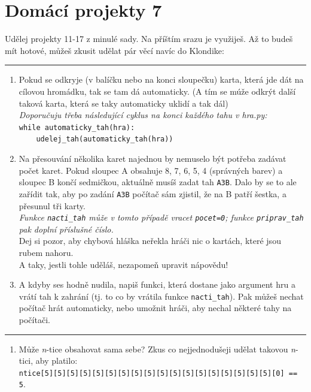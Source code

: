 \documentclass[a4paper,10pt]{article}
\newcommand\plsetno{7}
\begin{document}
\section*{Domácí projekty \plsetno}

Udělej projekty 11-17 z minulé sady. Na příštím srazu je využiješ.
Až to budeš mít hotové, můžeš zkusit udělat pár věcí navíc do Klondike:

\bigskip\bigskip
\hrule

\begin{enumerate}

\item Pokud se odkryje (v balíčku nebo na konci sloupečku) karta, která jde dát
    na cílovou hromádku, tak se tam dá automaticky.
    (A tím se múže odkrýt další taková karta, která se taky automaticky
    uklidí a tak dál)
    \\\emph{Doporučuju třeba následující cyklus na konci každého tahu v hra.py:}
    \\\verb+while automaticky_tah(hra):+
    \\\verb+    udelej_tah(automaticky_tah(hra))+

\item Na přesouvání několika karet najednou by nemuselo být potřeba zadávat
    počet karet. Pokud sloupec A obsahuje 8, 7, 6, 5, 4 (správných barev)
    a sloupec B končí sedmičkou, aktuálně musíš zadat tah \verb+A3B+.
    Dalo by se to ale zařídit tak, aby po zadání \verb+A3B+ počítač
    sám zjistil, že na B patří šestka, a přesunul tři karty.
    \\\emph{Funkce \texttt{nacti\_tah} může v tomto případě vracet \texttt{pocet=0};
            funkce \texttt{priprav\_tah} pak doplní příslušné číslo.}
    \\Dej si pozor, aby chybová hláška neřekla hráči nic o kartách, které jsou
    rubem nahoru.
    \\A taky, jestli tohle uděláš, nezapomeň upravit nápovědu!

\item A kdyby ses hodně nudila, napiš funkci, která dostane jako argument hru
    a vrátí tah k zahrání (tj. to co by vrátila funkce \verb+nacti_tah+).
    Pak můžeš nechat počítač hrát automaticky, nebo umožnit hráči,
    aby nechal některé tahy na počítači.

\end{enumerate}

\hrule

\begin{enumerate}[resume]

\item Může \emph{n}-tice obsahovat sama sebe? Zkus co nejjednodušeji udělat takovou \emph{n}-tici, aby platilo:
    \\\verb+ntice[5][5][5][5][5][5][5][5][5][5][5][5][5][5][5][5][5][5][0] == 5+.

\end{enumerate}
\end{document}
